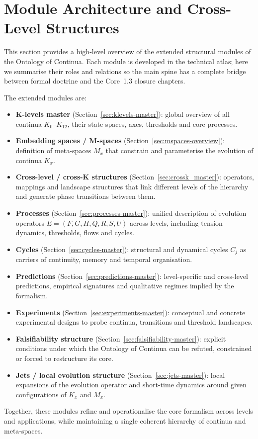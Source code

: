 
\section{Module Architecture and Cross-Level Structures}
\label{sec:modules_master}

This section provides a high-level overview of the extended structural modules
of the Ontology of Continua. Each module is developed in the technical atlas;
here we summarise their roles and relations so the main spine has a complete
bridge between formal doctrine and the Core~1.3 closure chapters.

The extended modules are:

\begin{itemize}
\item \textbf{K-levels master} (Section~\ref{sec:klevels-master}):
  global overview of all continua \(K_0\)–\(K_{12}\), their state spaces,
  axes, thresholds and core processes.

\item \textbf{Embedding spaces / M-spaces} (Section~\ref{sec:mspaces-overview}):
  definition of meta-spaces \(M_x\) that constrain and parameterise the
  evolution of continua \(K_x\).

\item \textbf{Cross-level / cross-K structures} (Section~\ref{sec:crossk_master}):
  operators, mappings and landscape structures that link different levels
  of the hierarchy and generate phase transitions between them.

\item \textbf{Processes} (Section~\ref{sec:processes-master}):
  unified description of evolution operators \(E = (F,G,H,Q,R,S,U)\) across
  levels, including tension dynamics, thresholds, flows and cycles.

\item \textbf{Cycles} (Section~\ref{sec:cycles-master}):
  structural and dynamical cycles \(C_j\) as carriers of continuity,
  memory and temporal organisation.

\item \textbf{Predictions} (Section~\ref{sec:predictions-master}):
  level-specific and cross-level predictions, empirical signatures and
  qualitative regimes implied by the formalism.

\item \textbf{Experiments} (Section~\ref{sec:experiments-master}):
  conceptual and concrete experimental designs to probe continua,
  transitions and threshold landscapes.

\item \textbf{Falsifiability structure} (Section~\ref{sec:falsifiability-master}):
  explicit conditions under which the Ontology of Continua can be
  refuted, constrained or forced to restructure its core.

\item \textbf{Jets / local evolution structure} (Section~\ref{sec:jets-master}):
  local expansions of the evolution operator and short-time dynamics
  around given configurations of \(K_x\) and \(M_x\).
\end{itemize}

Together, these modules refine and operationalise the core formalism across
levels and applications, while maintaining a single coherent hierarchy of
continua and meta-spaces.
